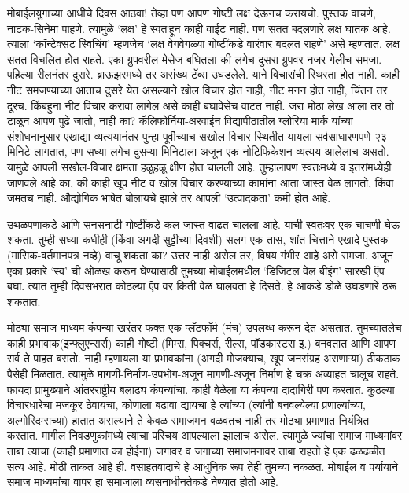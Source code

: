 मोबाईलयुगाच्या आधीचे दिवस आठवा! तेव्हा पण आपण गोष्टी लक्ष देऊनच करायचो. पुस्तक वाचणे, नाटक-सिनेमा पाहणे. त्यामुळे `लक्ष' हे स्वतःहून काही वाईट नाही. पण सतत बदलणारे लक्ष घातक आहे. त्याला `कॉन्टेक्सट स्विचिंग' म्हणजेच `लक्ष वेगवेगळ्या गोष्टींकडे वारंवार बदलत राहणे' असे म्हणतात. लक्ष सतत विचलित होत राहते. एका ग्रुपवरील मेसेज बघितला की लगेच दुसरा ग्रुपवर नजर गेलीच समजा. पहिल्या रीलनंतर दुसरे. ब्राऊझरमध्ये तर असंख्य टॅब्स उघडलेले. याने विचारांची स्थिरता होत नाही. काही नीट समजण्याच्या आताच दुसरे येत असल्याने खोल विचार होत नाही, नीट मनन होत नाही, चिंतन तर दूरच. किंबहुना नीट विचार करावा लागेल असे काही बघावेसेच वाटत नाही. जरा मोठा लेख आला तर तो टाळून आपण पुढे जातो, नाही का? कॅलिफोर्निया-अरवाईन विद्यापीठातील ग्लोरिया मार्क यांच्या संशोधनानुसार एखाद्या व्यत्ययानंतर पुन्हा पूर्वीच्याच सखोल विचार स्थितीत यायला सर्वसाधारणपणे २३ मिनिटे लागतात, पण सध्या लगेच दुसऱ्या मिनिटाला अजून एक नोटिफिकेशन-व्यत्यय आलेलाच असतो. यामुळे आपली सखोल-विचार क्षमता हळूहळू क्षीण होत चालली आहे. तुम्हालापण स्वतःमध्ये व इतरांमध्येही जाणवले आहे का, की काही खूप नीट व खोल विचार करण्याच्या कामांना आता जास्त वेळ लागतो, किंवा जमतच नाही. औद्योगिक भाषेत बोलायचे झाले तर आपली `उत्पादकता' कमी होत आहे.

उथळपणाकडे आणि सनसनाटी गोष्टींकडे कल जास्त वाढत चालला आहे. याची स्वतःवर एक चाचणी घेऊ शकता. तुम्ही सध्या कधीही (किंवा अगदी सुट्टीच्या दिवशी) सलग एक तास, शांत चित्ताने एखादे पुस्तक (मासिक-वर्तमानपत्र नव्हे) वाचू शकता का? उत्तर नाही असेल तर, विषय गंभीर आहे असे समजा. अजून एका प्रकारे `स्व' ची ओळख करून घेण्यासाठी तुमच्या मोबाईलमधील `डिजिटल वेल बीइंग' सारखी ऍप बघा. त्यात तुम्ही दिवसभरात कोठल्या ऍप वर किती वेळ घालवता हे दिसते. हे आकडे डोळे उघडणारे ठरू शकतात.

मोठ्या समाज माध्यम कंपन्या खरंतर फक्त एक प्लॅटफॉर्म (मंच) उपलब्ध करून देत असतात. तुमच्यातलेच काही  प्रभावाक(इन्फ्लुएन्सर्स) काही गोष्टी (मिम्स, पिक्चर्स, रील्स, पॉडकास्टस इ.) बनवतात आणि आपण सर्व ते पाहत बसतो. नाही म्हणायला या प्रभावकांना (अगदी मोजक्याच, खूप जनसंग्रह असणाऱ्या) ठीकठाक पैसेही मिळतात. त्यामुळे मागणी-निर्माण-उपभोग-अजून मागणी-अजून निर्माण हे चक्र अव्याहत चालूच राहते. फायदा प्रामुख्याने आंतरराष्ट्रीय बलाढ्य कंपन्यांचा. काही वेळेला या कंपन्या दादागिरी पण करतात. कुठल्या विचारधारेचा मजकूर ठेवायचा, कोणाला बढावा द्यायचा हे त्यांच्या (त्यांनी बनवल्येल्या प्रणाल्यांच्या, अल्गोरिदम्सच्या) हातात असल्याने ते केवळ  समाजमन वळवतच नाही तर मोठ्या प्रमाणात नियंत्रित करतात. मागील निवडणुकांमध्ये त्याचा परिचय आपल्याला झालाच असेल. त्यामुळे ज्यांचा समाज माध्यमांवर ताबा त्यांचा (काही प्रमाणात का होईना) जगावर व जगाच्या समाजमनावर ताबा राहतो हे एक ढळढळीत सत्य आहे. मोठी ताकत आहे ही. वसाहतवादाचे हे आधुनिक रूप तेही तुमच्या नकळत. मोबाईल व पर्यायाने समाज माध्यमांचा वापर हा समाजाला व्यसनाधीनतेकडे नेण्यात होतो आहे.

